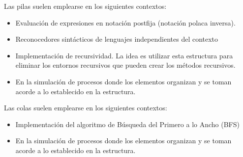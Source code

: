 Las pilas suelen emplearse en los siguientes contextos:

\begin{itemize}
	\item Evaluación de expresiones en notación postfija (notación polaca inversa).
	\item Reconocedores sintácticos de lenguajes independientes del contexto
	\item Implementación de recursividad. La idea es utilizar esta estructura para eliminar los entornos recursivos que pueden crear los métodos recursivos.
	\item En la simulación de procesos donde los elementos organizan y se toman acorde a lo establecido en la estructura.
\end{itemize}

Las colas suelen emplearse en los siguientes contextos:

\begin{itemize}
	\item Implementación del algoritmo de Búsqueda del Primero a lo Ancho (BFS)
	\item En la simulación de procesos donde los elementos organizan y se toman acorde a lo establecido en la estructura.
\end{itemize}